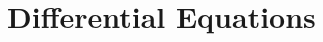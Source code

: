 \documentclass[../main]{subfiles}
\begin{document}
\section{Differential Equations}

	
\end{document}
